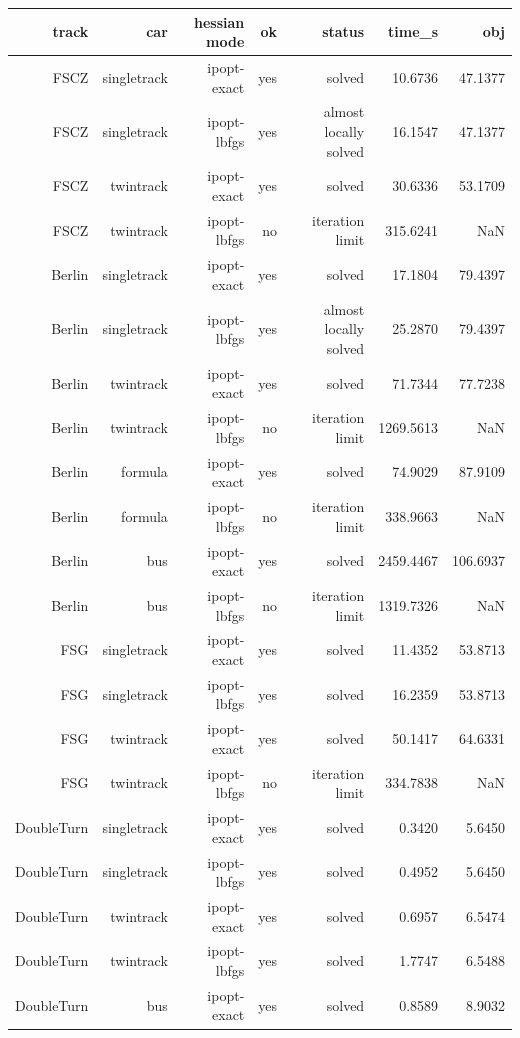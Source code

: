 {\footnotesize
\begin{longtable}{|r|r|r|r|r|r|r|}
  \hline
  \textbf{track} & \textbf{car} & \textbf{hessian mode} & \textbf{ok} & \textbf{status} & \textbf{time\_s} & \textbf{obj} \\
  \hline
  FSCZ & singletrack & ipopt-exact & yes & solved & 10.6736 & 47.1377 \\
  FSCZ & singletrack & ipopt-lbfgs & yes & almost locally solved & 16.1547 & 47.1377 \\
  FSCZ & twintrack & ipopt-exact & yes & solved & 30.6336 & 53.1709 \\
  FSCZ & twintrack & ipopt-lbfgs & no & iteration limit & 315.6241 & NaN \\
  Berlin & singletrack & ipopt-exact & yes & solved & 17.1804 & 79.4397 \\
  Berlin & singletrack & ipopt-lbfgs & yes & almost locally solved & 25.2870 & 79.4397 \\
  Berlin & twintrack & ipopt-exact & yes & solved & 71.7344 & 77.7238 \\
  Berlin & twintrack & ipopt-lbfgs & no & iteration limit & 1269.5613 & NaN \\
  Berlin & formula & ipopt-exact & yes & solved & 74.9029 & 87.9109 \\
  Berlin & formula & ipopt-lbfgs & no & iteration limit & 338.9663 & NaN \\
  Berlin & bus & ipopt-exact & yes & solved & 2459.4467 & 106.6937 \\
  Berlin & bus & ipopt-lbfgs & no & iteration limit & 1319.7326 & NaN \\
  FSG & singletrack & ipopt-exact & yes & solved & 11.4352 & 53.8713 \\
  FSG & singletrack & ipopt-lbfgs & yes & solved & 16.2359 & 53.8713 \\
  FSG & twintrack & ipopt-exact & yes & solved & 50.1417 & 64.6331 \\
  FSG & twintrack & ipopt-lbfgs & no & iteration limit & 334.7838 & NaN \\
  DoubleTurn & singletrack & ipopt-exact & yes & solved & 0.3420 & 5.6450 \\
  DoubleTurn & singletrack & ipopt-lbfgs & yes & solved & 0.4952 & 5.6450 \\
  DoubleTurn & twintrack & ipopt-exact & yes & solved & 0.6957 & 6.5474 \\
  DoubleTurn & twintrack & ipopt-lbfgs & yes & solved & 1.7747 & 6.5488 \\
  DoubleTurn & bus & ipopt-exact & yes & solved & 0.8589 & 8.9032 \\

\end{longtable}}
